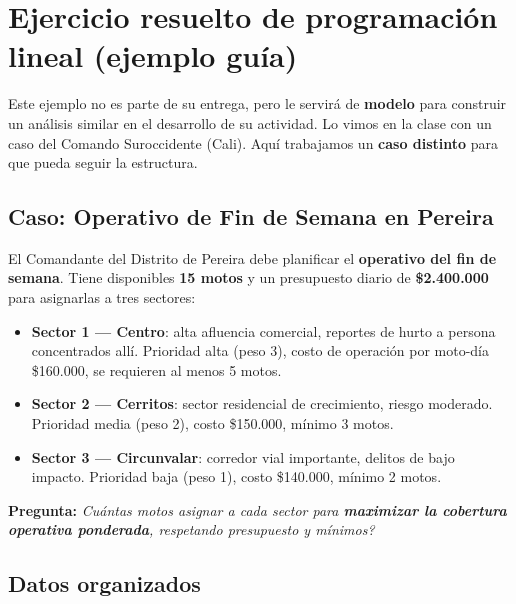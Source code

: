 \documentclass[11pt, a4paper]{article}
\begin{document}
\newpage

\section{Ejercicio resuelto de programaci\'on lineal (ejemplo gu\'ia)}

Este ejemplo no es parte de su entrega, pero le servir\'a de \textbf{modelo} para construir un an\'alisis similar en el desarrollo de su actividad. Lo vimos en la clase con un caso del Comando Suroccidente (Cali). Aqu\'i trabajamos un \textbf{caso distinto} para que pueda seguir la estructura.

\subsection{Caso: Operativo de Fin de Semana en Pereira}

\begin{cajaInfo}
El Comandante del Distrito de Pereira debe planificar el \textbf{operativo del fin de semana}. Tiene disponibles \textbf{15 motos} y un presupuesto diario de \textbf{\$2.400.000} para asignarlas a tres sectores:

\begin{itemize}[leftmargin=1.5em]
\item \textbf{Sector 1 --- Centro}: alta afluencia comercial, reportes de hurto a persona concentrados all\'i. Prioridad alta (peso 3), costo de operaci\'on por moto-d\'ia \$160.000, se requieren al menos 5 motos.
\item \textbf{Sector 2 --- Cerritos}: sector residencial de crecimiento, riesgo moderado. Prioridad media (peso 2), costo \$150.000, m\'inimo 3 motos.
\item \textbf{Sector 3 --- Circunvalar}: corredor vial importante, delitos de bajo impacto. Prioridad baja (peso 1), costo \$140.000, m\'inimo 2 motos.
\end{itemize}

\textbf{Pregunta:} \textit{\textquestiondown Cu\'antas motos asignar a cada sector para \textbf{maximizar la cobertura operativa ponderada}, respetando presupuesto y m\'inimos?}
\end{cajaInfo}

\subsection{Datos organizados}
\end{document}
